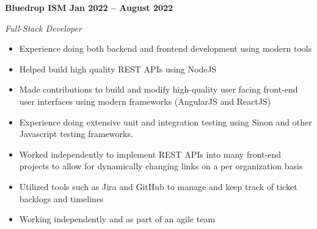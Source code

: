 \vspace{0.1cm}
\textbf{Bluedrop ISM \hfill Jan 2022 -- August 2022} \par
\textit{Full-Stack Developer} \par
\begin{itemize}
	\item Experience doing both backend and frontend development using modern tools
    \item Helped build high quality REST APIs using NodeJS
    \item Made contributions to build and modify high-quality user facing front-end user interfaces using modern frameworks (AngularJS and ReactJS)
    \item Experience doing extensive unit and integration testing using Sinon and other Javascript testing frameworks.
    \item Worked independently to implement REST APIs into many front-end projects to allow for dynamically changing links on a per organization basis
    \item Utilized tools such as Jira and GitHub to manage and keep track of ticket backlogs and timelines
    \item Working independently and as part of an agile team
\end{itemize} \par